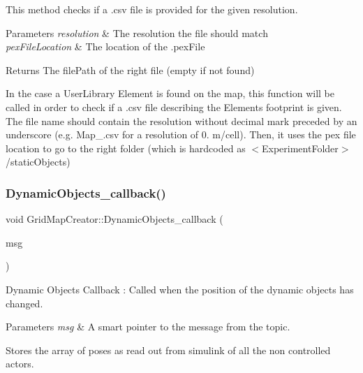 This method checks if a .csv file is provided for the given resolution. 


\begin{DoxyParams}{Parameters}
{\em resolution} & The resolution the file should match \\
\hline
{\em pex\+File\+Location} & The location of the .pex\+File \\
\hline
\end{DoxyParams}
\begin{DoxyReturn}{Returns}
The file\+Path of the right file (empty if not found)
\end{DoxyReturn}
In the case a User\+Library Element is found on the map, this function will be called in order to check if a .csv file describing the Elements footprint is given. The file name should contain the resolution without decimal mark preceded by an underscore (e.\+g. Map\+\_.\+csv for a resolution of 0. m/cell). Then, it uses the pex file location to go to the right folder (which is hardcoded as $<$\+Experiment\+Folder$>$/static\+Objects) \mbox{\label{classGridMapCreator_a3ed1c6283cdc380092e1fdeee372341b}} 
\subsubsection{\texorpdfstring{Dynamic\+Objects\+\_\+callback()}{DynamicObjects\_callback()}}
{\footnotesize\ttfamily void Grid\+Map\+Creator\+::\+Dynamic\+Objects\+\_\+callback (\begin{DoxyParamCaption}\item[{const geometry\+\_\+msgs\+::\+Pose\+Array\+::\+Const\+Ptr \&}]{msg }\end{DoxyParamCaption})\hspace{0.3cm}{\ttfamily [inline]}}



Dynamic Objects Callback \+: Called when the position of the dynamic objects has changed. 


\begin{DoxyParams}{Parameters}
{\em msg} & A smart pointer to the message from the topic.\\
\hline
\end{DoxyParams}
Stores the array of poses as read out from simulink of all the non controlled actors. \mbox{\label{classGridMapCreator_af222d2b22ad9d566c35383dafa056d3e}} 
